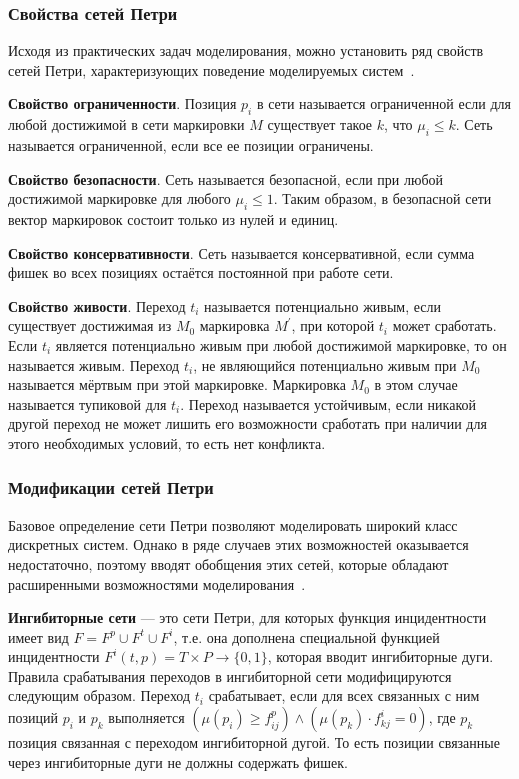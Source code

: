 \FloatBarrier

\subsubsection{Свойства сетей Петри}

Исходя из практических задач моделирования, можно установить ряд свойств сетей Петри, характеризующих поведение моделируемых систем~\cite{petri}.

\textbf{Свойство ограниченности}. Позиция $p_i$ в сети называется ограниченной если для любой достижимой в сети маркировки $M$ существует такое $k$, что $\mu_i \le k$. Сеть называется ограниченной, если все ее позиции ограничены.

\textbf{Свойство безопасности}. Сеть называется безопасной, если при любой достижимой маркировке для любого $\mu_i \le 1$. Таким образом, в безопасной сети вектор маркировок состоит только из нулей и единиц.

\textbf{Свойство консервативности}. Сеть называется консервативной, если сумма фишек во всех позициях остаётся постоянной при работе сети.

\textbf{Свойство живости}. Переход $t_i$ называется потенциально живым, если существует достижимая из $M_0$ маркировка $M^\prime$, при которой $t_i$ может сработать. Если $t_i$ является потенциально живым при любой достижимой маркировке, то он называется живым. Переход $t_i$, не являющийся потенциально живым при $M_0$ называется мёртвым при этой маркировке. Маркировка $M_0$ в этом случае называется тупиковой для $t_i$. Переход называется устойчивым, если никакой другой переход не может лишить его возможности сработать при наличии для этого необходимых условий, то есть нет конфликта.

\subsubsection{Модификации сетей Петри}

Базовое определение сети Петри позволяют моделировать широкий класс дискретных систем. Однако в ряде случаев этих возможностей оказывается недостаточно, поэтому вводят обобщения этих сетей, которые обладают расширенными возможностями моделирования~\cite{petri}.

\textbf{Ингибиторные сети} --- это сети Петри, для которых функция инцидентности имеет вид $F = F^p \cup F^t \cup F^i$, т.е. она дополнена специальной функцией инцидентности $F^i(t, p) = T \times P \rightarrow\{0,1\}$, которая вводит ингибиторные дуги. Правила срабатывания переходов в ингибиторной сети модифицируются следующим образом. Переход $t_i$ срабатывает, если для всех связанных с ним позиций $p_i$ и $p_k$ выполняется $(\mu(p_i) \ge f_{ij}^p) \wedge (\mu(p_k) \cdot f^i_{kj} = 0)$, где  $p_k$ позиция связанная с переходом ингибиторной дугой. То есть позиции связанные через ингибиторные дуги не должны содержать фишек.

